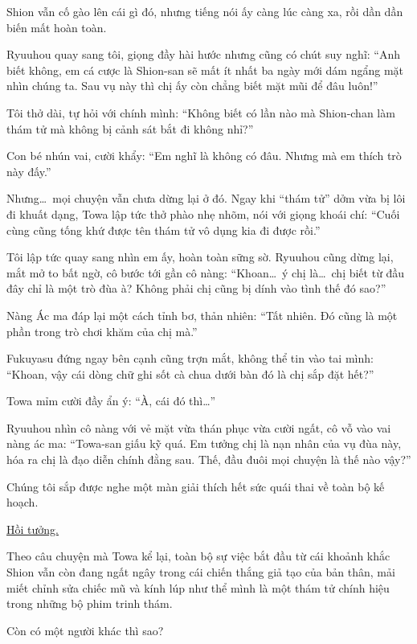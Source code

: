 \documentclass[../main.tex]{subfiles}
\begin{document}
Shion vẫn cố gào lên cái gì đó, nhưng tiếng nói ấy càng lúc càng xa, rồi dần dần biến mất hoàn toàn.

Ryuuhou quay sang tôi, giọng đầy hài hước nhưng cũng có chút suy nghĩ: ``Anh biết không, em cá cược là Shion-san sẽ mất ít nhất ba ngày mới dám ngẩng mặt nhìn chúng ta. Sau vụ này thì chị ấy còn chẳng biết mặt mũi để đâu luôn!''

Tôi thở dài, tự hỏi với chính mình: ``Không biết có lần nào mà Shion-chan làm thám tử mà không bị cảnh sát bắt đi không nhỉ?''

Con bé nhún vai, cười khẩy: ``Em nghĩ là không có đâu. Nhưng mà em thích trò này đấy.''

Nhưng\dots\ mọi chuyện vẫn chưa dừng lại ở đó. Ngay khi ``thám tử'' dởm vừa bị lôi đi khuất dạng, Towa lập tức thở phào nhẹ nhõm, nói với giọng khoái chí: ``Cuối cùng cũng tống khứ được tên thám tử vô dụng kia đi được rồi.''

Tôi lập tức quay sang nhìn em ấy, hoàn toàn sững sờ. Ryuuhou cũng dừng lại, mắt mở to bất ngờ, cô bước tới gần cô nàng: ``Khoan\dots\ ý chị là\dots\ chị biết từ đầu đây chỉ là một trò đùa à? Không phải chị cũng bị dính vào tình thế đó sao?''

Nàng Ác ma đáp lại một cách tỉnh bơ, thản nhiên: ``Tất nhiên. Đó cũng là một phần trong trò chơi khăm của chị mà.''

Fukuyasu đứng ngay bên cạnh cũng trợn mắt, không thể tin vào tai mình: ``Khoan, vậy cái dòng chữ ghi sốt cà chua dưới bàn đó là chị sắp đặt hết?''

Towa mỉm cười đầy ẩn ý: ``À, cái đó thì\dots''

Ryuuhou nhìn cô nàng với vẻ mặt vừa thán phục vừa cười ngất, cô vỗ vào vai nàng ác ma: ``Towa-san giấu kỹ quá. Em tưởng chị là nạn nhân của vụ đùa này, hóa ra chị là đạo diễn chính đằng sau. Thế, đầu đuôi mọi chuyện là thế nào vậy?''

Chúng tôi sắp được nghe một màn giải thích hết sức quái thai về toàn bộ kế hoạch.

\begin{center}
  \uline{Hồi tưởng.}
\end{center}

Theo câu chuyện mà Towa kể lại, toàn bộ sự việc bắt đầu từ cái khoảnh khắc Shion vẫn còn đang ngất ngây trong cái chiến thắng giả tạo của bản thân, mải miết chỉnh sửa chiếc mũ và kính lúp như thể mình là một thám tử chính hiệu trong những bộ phim trinh thám.

Còn có một người khác thì sao?
\end{document}
